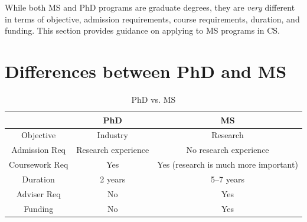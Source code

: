\documentclass[oneside,11pt,dvipsnames]{book}
\begin{document}
While both MS and PhD programs are graduate degrees, they are \emph{very} different in terms of objective, admission requirements, course requirements, duration, and funding. This section provides guidance on applying to MS programs in CS.

\section{Differences between PhD and MS}


\begin{table}
    \caption{PhD vs. MS}\label{tab:phd-vs-ms}
    \begin{tabular}{c|c|c}
    \toprule
    \textbf{} & \textbf{PhD} & \textbf{MS} \\
    \midrule
    Objective & Industry & Research \\
    Admission Req & Research experience & No research experience \\
    Coursework Req & Yes & Yes (research is much more important)  \\
    Duration & 2 years & 5--7 years \\
    Adviser Req & No & Yes \\
    Funding & No & Yes \\
    \bottomrule
    \end{tabular}
  \end{table}
\end{document}
